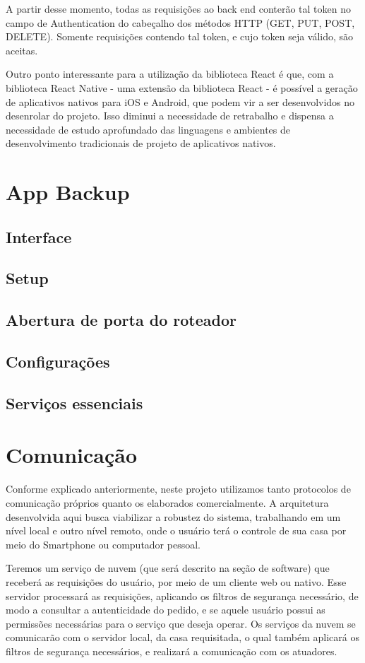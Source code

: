 A partir desse momento, todas as requisições ao back end conterão tal token no campo de Authentication do cabeçalho dos métodos HTTP (GET, PUT, POST, DELETE). Somente requisições contendo tal token, e cujo token seja válido, são aceitas.

Outro ponto interessante para a utilização da biblioteca React é que, com a biblioteca React Native - uma extensão da biblioteca React - é possível a geração de aplicativos nativos para iOS e Android, que podem vir a ser desenvolvidos no desenrolar do projeto. Isso diminui a necessidade de retrabalho e dispensa a necessidade de estudo aprofundado das linguagens e ambientes de desenvolvimento tradicionais de projeto de aplicativos nativos.

\section{App Backup}
\subsection{Interface}
\subsection{Setup}
\subsection{Abertura de porta do roteador}
\subsection{Configurações}
\subsection{Serviços essenciais}

\section{Comunicação}
Conforme explicado anteriormente, neste projeto utilizamos tanto protocolos de comunicação próprios quanto os elaborados comercialmente. A arquitetura desenvolvida aqui busca viabilizar a robustez do sistema, trabalhando em um nível local e outro nível remoto, onde o usuário terá o controle de sua casa por meio do Smartphone ou computador pessoal.

Teremos um serviço de nuvem (que será descrito na seção de software) que receberá as requisições do usuário, por meio de um cliente web ou nativo. Esse servidor processará as requisições, aplicando os filtros de segurança necessário, de modo a consultar a autenticidade do pedido, e se aquele usuário possui as permissões necessárias para o serviço que deseja operar. Os serviços da nuvem se comunicarão com o servidor local, da casa requisitada, o qual também aplicará os filtros de segurança necessários, e realizará a comunicação com os atuadores.

